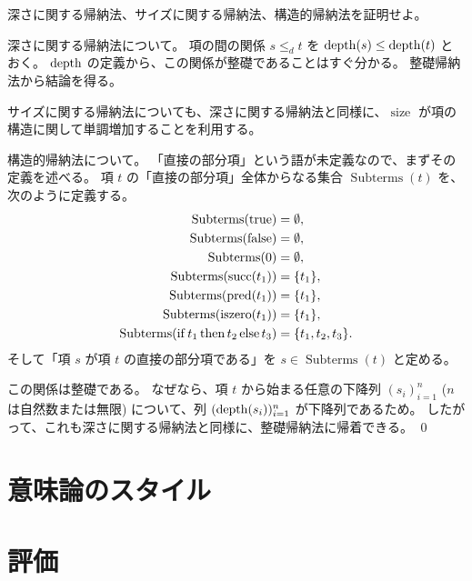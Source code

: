 \begin{jexercise*}[定理3.3.4.の証明]
  深さに関する帰納法、サイズに関する帰納法、構造的帰納法を証明せよ。
\end{jexercise*}
\begin{jproof}
  深さに関する帰納法について。
  項の間の関係 $s \leq_d t$ を $\operatorname{depth}(s) \leq \operatorname{depth}(t)$ とおく。
  $\operatorname{depth}$ の定義から、この関係が整礎であることはすぐ分かる。
  整礎帰納法から結論を得る。

  サイズに関する帰納法についても、深さに関する帰納法と同様に、$\operatorname{size}$ が項の構造に関して単調増加することを利用する。

  構造的帰納法について。
  「直接の部分項」という語が未定義なので、まずその定義を述べる。
  項 $t$ の「直接の部分項」全体からなる集合 $\operatorname{Subterms}(t)$ を、次のように定義する。
  \begin{align*}
    \operatorname{Subterms}(\operatorname{true}) & = \emptyset,
    \\ \operatorname{Subterms}(\operatorname{false}) & = \emptyset,
    \\ \operatorname{Subterms}(0) & = \emptyset,
    \\ \operatorname{Subterms}(\operatorname{succ}(t_1))
      & = \{t_1\},
    \\ \operatorname{Subterms}(\operatorname{pred}(t_1))
      & = \{t_1\},
    \\ \operatorname{Subterms}(\operatorname{iszero}(t_1))
      & = \{t_1\},
    \\ \operatorname{Subterms}(\operatorname{if} t_1 \operatorname{then} t_2 \operatorname{else} t_3)
      & = \{t_1, t_2, t_3\}.
  \end{align*}
  そして「項 $s$ が項 $t$ の直接の部分項である」を $s \in \operatorname{Subterms}(t)$ と定める。

  この関係は整礎である。
  なぜなら、項 $t$ から始まる任意の下降列 $(s_i)_{i=1}^n$ ($n$ は自然数または無限) について、列 $(\operatorname{depth}(s_i))_{i=1}^n$ が下降列であるため。
  したがって、これも深さに関する帰納法と同様に、整礎帰納法に帰着できる。
  \qed
\end{jproof}

\section{意味論のスタイル}

\section{評価}

